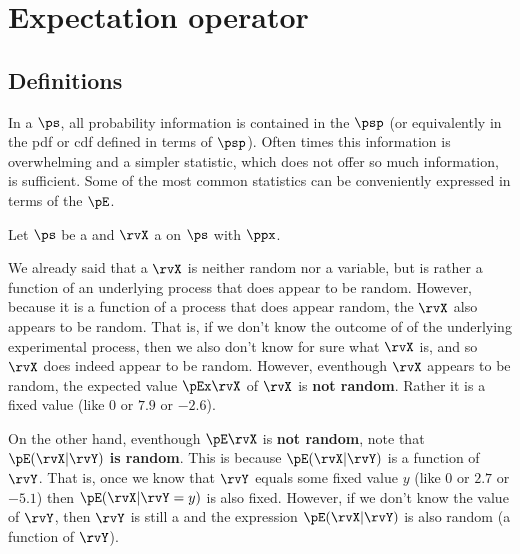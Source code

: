 \chapter{Expectation operator}
\label{chp:stats}
\section{Definitions}
In a  $\ps$, all probability information
is contained in the  $\psp$ (or equivalently in the pdf or cdf
defined in terms of $\psp$).
Often times this information is overwhelming and a simpler statistic,
which does not offer so much information, is sufficient.
Some of the most common statistics can be conveniently expressed in terms
of the  $\pE$.
\begin{definition}
\label{def:pE}
Let $\ps$ be a  and
$\rvX$ a  on $\ps$ with
 $\ppx$.
\end{definition}

We already said that a  $\rvX$ is neither random nor a variable,
but is rather a function of an underlying process that does appear to be random.
However, because it is a function of a process that does appear random,
the  $\rvX$ also appears to be random.
That is, if we don't know the outcome of of the underlying experimental
process, then we also don't know for sure what $\rvX$ is, and so $\rvX$ does
indeed appear to be random.
However, eventhough $\rvX$ appears to be random,
the expected value $\pEx\rvX$  of $\rvX$ is {\bf not random}.
Rather it is a fixed value (like $0$ or $7.9$ or $-2.6$).

On the other hand, eventhough $\pE\rvX$ is {\bf not random},
note that $\pE(\rvX|\rvY)$ {\bf is random}.
This is because $\pE(\rvX|\rvY)$ is a function of $\rvY$.
That is, once we know that $\rvY$ equals some fixed value $y$
(like $0$ or $2.7$ or $-5.1$) then $\pE(\rvX|\rvY=y)$ is also fixed.
However, if we don't know the value of $\rvY$,
then $\rvY$ is still a  and the expression $\pE(\rvX|\rvY)$
is also random (a function of  $\rvY$).

